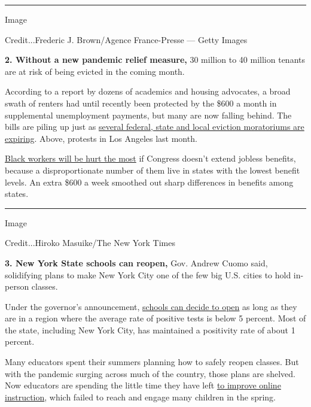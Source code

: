 \begin{center}\rule{0.5\linewidth}{\linethickness}\end{center}

Image

Credit...Frederic J. Brown/Agence France-Presse --- Getty Images

\textbf{2. Without a new pandemic relief measure,} 30 million to 40
million tenants are at risk of being evicted in the coming month.

According to a report by dozens of academics and housing advocates, a
broad swath of renters had until recently been protected by the \$600 a
month in supplemental unemployment payments, but many are now falling
behind. The bills are piling up just as
\href{https://www.nytimes3xbfgragh.onion/2020/08/07/business/economy/housing-economy-eviction-renters.html}{several
federal, state and local eviction moratoriums are expiring}. Above,
protests in Los Angeles last month.

\href{https://www.nytimes3xbfgragh.onion/2020/08/07/upshot/unemployment-benefits-racial-disparity.html}{Black
workers will be hurt the most} if Congress doesn't extend jobless
benefits, because a disproportionate number of them live in states with
the lowest benefit levels. An extra \$600 a week smoothed out sharp
differences in benefits among states.

\begin{center}\rule{0.5\linewidth}{\linethickness}\end{center}

Image

Credit...Hiroko Masuike/The New York Times

\textbf{3. New York State schools can reopen,} Gov. Andrew Cuomo said,
solidifying plans to make New York City one of the few big U.S. cities
to hold in-person classes.

Under the governor's announcement,
\href{https://www.nytimes3xbfgragh.onion/2020/08/07/nyregion/cuomo-schools-reopening.html}{schools
can decide to open} as long as they are in a region where the average
rate of positive tests is below 5 percent. Most of the state, including
New York City, has maintained a positivity rate of about 1 percent.

Many educators spent their summers planning how to safely reopen
classes. But with the pandemic surging across much of the country, those
plans are shelved. Now educators are spending the little time they have
left
\href{https://www.nytimes3xbfgragh.onion/2020/08/07/us/remote-learning-fall-2020.html}{to
improve online instruction}, which failed to reach and engage many
children in the spring.

